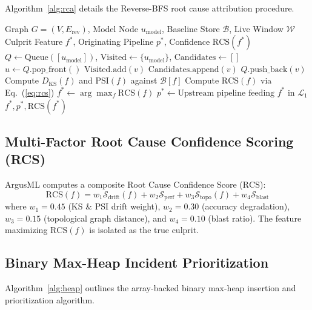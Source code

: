 \documentclass[conference]{IEEEtran}
\begin{document}
Algorithm~\ref{alg:rca} details the Reverse-BFS root cause attribution procedure.

\begin{algorithm}[htbp]
\caption{Reverse-BFS Upstream Root Cause Attribution}
\label{alg:rca}
\begin{algorithmic}[1]
\REQUIRE Graph $G = (V, E_{\text{rev}})$, Model Node $u_{\text{model}}$, Baseline Store $\mathcal{B}$, Live Window $\mathcal{W}$
\ENSURE Culprit Feature $f^*$, Originating Pipeline $p^*$, Confidence $\text{RCS}(f^*)$
\STATE $Q \gets \text{Queue}([u_{\text{model}}])$, $\text{Visited} \gets \{u_{\text{model}}\}$, $\text{Candidates} \gets []$
    \STATE $u \gets Q.\text{pop\_front}()$
            \STATE $\text{Visited}.\text{add}(v)$
                \STATE $\text{Candidates}.\text{append}(v)$
            \ENDIF
            \STATE $Q.\text{push\_back}(v)$
        \ENDIF
    \ENDFOR
\ENDWHILE
{}
    \STATE Compute $D_{\text{KS}}(f)$ and $\text{PSI}(f)$ against $\mathcal{B}[f]$
    \STATE Compute $\text{RCS}(f)$ via Eq.~(\ref{eq:rcs})
\ENDFOR
\STATE $f^* \gets \arg\max_{f} \text{RCS}(f)$
\STATE $p^* \gets \text{Upstream pipeline feeding } f^* \text{ in } \mathcal{L}_1$
\RETURN $f^*, p^*, \text{RCS}(f^*)$
\end{algorithmic}
\end{algorithm}

\subsection{Multi-Factor Root Cause Confidence Scoring (RCS)}
ArgusML computes a composite Root Cause Confidence Score ($\text{RCS}$):
\begin{equation}
\label{eq:rcs}
\text{RCS}(f) = w_1 \mathcal{S}_{\text{drift}}(f) + w_2 \mathcal{S}_{\text{perf}} + w_3 \mathcal{S}_{\text{topo}}(f) + w_4 \mathcal{S}_{\text{blast}}
\end{equation}
where $w_1 = 0.45$ (KS \& PSI drift weight), $w_2 = 0.30$ (accuracy degradation), $w_3 = 0.15$ (topological graph distance), and $w_4 = 0.10$ (blast ratio). The feature maximizing $\text{RCS}(f)$ is isolated as the true culprit.

\subsection{Binary Max-Heap Incident Prioritization}
Algorithm~\ref{alg:heap} outlines the array-backed binary max-heap insertion and prioritization algorithm.
\end{document}
